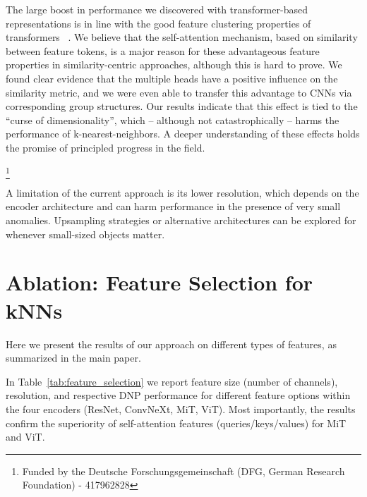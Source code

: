 \documentclass[10pt,twocolumn,letterpaper]{article}
\newcommand\blfootnote[1]{\begingroup
  \renewcommand\thefootnote{}\footnote{#1}\addtocounter{footnote}{-1}\endgroup
}
\begin{document}
The large boost in performance we discovered with transformer-based representations is in line with the good feature clustering properties of transformers ~\cite{caron2021emerging,melas2022deep,zadaianchuk2022unsupervised}. 
We believe that the self-attention mechanism, based on similarity between feature tokens, is a major reason for these advantageous feature properties in similarity-centric approaches, although this is hard to prove. We found clear evidence that the multiple heads have a positive influence on the similarity metric, and we were even able to transfer this advantage to CNNs via corresponding group structures. 
Our results indicate that this effect is tied to the ``curse of dimensionality'', which -- although not catastrophically -- harms the performance of k-nearest-neighbors.
A deeper understanding of these effects holds the promise of principled progress in the field.






\blfootnote{Funded by the Deutsche Forschungsgemeinschaft (DFG, German Research Foundation) - 417962828}

A limitation of the current approach is its lower resolution, which depends on the encoder architecture and can harm performance in the presence of very small anomalies. Upsampling strategies or alternative architectures can be explored for whenever small-sized objects matter.


 
\FloatBarrier


{\small


}

\newpage
\section{Ablation: Feature Selection for kNNs}
Here we present the results of our approach on different types of features, as summarized in the main paper.

In Table~\ref{tab:feature_selection} we report feature size (number of channels), resolution, and respective DNP performance for different feature options within the four encoders (ResNet, ConvNeXt, MiT, ViT). Most importantly, the results confirm the superiority of self-attention features (queries/keys/values) for MiT and ViT.
\end{document}
